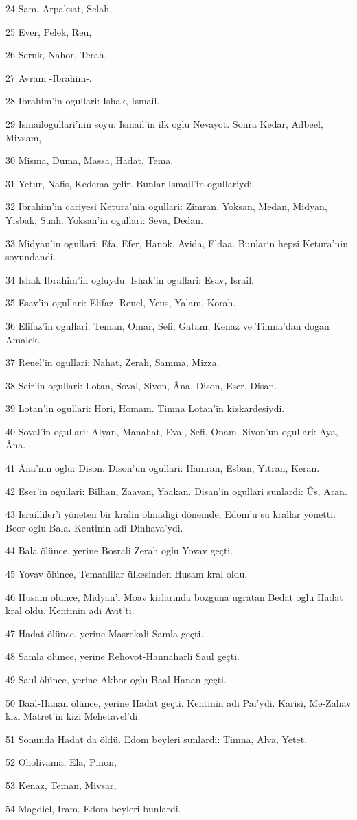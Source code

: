 \par 24 Sam, Arpaksat, Selah,
\par 25 Ever, Pelek, Reu,
\par 26 Seruk, Nahor, Terah,
\par 27 Avram -Ibrahim-.
\par 28 Ibrahim'in ogullari: Ishak, Ismail.
\par 29 Ismailogullari'nin soyu: Ismail'in ilk oglu Nevayot. Sonra Kedar, Adbeel, Mivsam,
\par 30 Misma, Duma, Massa, Hadat, Tema,
\par 31 Yetur, Nafis, Kedema gelir. Bunlar Ismail'in ogullariydi.
\par 32 Ibrahim'in cariyesi Ketura'nin ogullari: Zimran, Yoksan, Medan, Midyan, Yisbak, Suah. Yoksan'in ogullari: Seva, Dedan.
\par 33 Midyan'in ogullari: Efa, Efer, Hanok, Avida, Eldaa. Bunlarin hepsi Ketura'nin soyundandi.
\par 34 Ishak Ibrahim'in ogluydu. Ishak'in ogullari: Esav, Israil.
\par 35 Esav'in ogullari: Elifaz, Reuel, Yeus, Yalam, Korah.
\par 36 Elifaz'in ogullari: Teman, Omar, Sefi, Gatam, Kenaz ve Timna'dan dogan Amalek.
\par 37 Reuel'in ogullari: Nahat, Zerah, Samma, Mizza.
\par 38 Seir'in ogullari: Lotan, Soval, Sivon, Âna, Dison, Eser, Disan.
\par 39 Lotan'in ogullari: Hori, Homam. Timna Lotan'in kizkardesiydi.
\par 40 Soval'in ogullari: Alyan, Manahat, Eval, Sefi, Onam. Sivon'un ogullari: Aya, Âna.
\par 41 Âna'nin oglu: Dison. Dison'un ogullari: Hamran, Esban, Yitran, Keran.
\par 42 Eser'in ogullari: Bilhan, Zaavan, Yaakan. Disan'in ogullari sunlardi: Ûs, Aran.
\par 43 Israilliler'i yöneten bir kralin olmadigi dönemde, Edom'u su krallar yönetti: Beor oglu Bala. Kentinin adi Dinhava'ydi.
\par 44 Bala ölünce, yerine Bosrali Zerah oglu Yovav geçti.
\par 45 Yovav ölünce, Temanlilar ülkesinden Husam kral oldu.
\par 46 Husam ölünce, Midyan'i Moav kirlarinda bozguna ugratan Bedat oglu Hadat kral oldu. Kentinin adi Avit'ti.
\par 47 Hadat ölünce, yerine Masrekali Samla geçti.
\par 48 Samla ölünce, yerine Rehovot-Hannaharli Saul geçti.
\par 49 Saul ölünce, yerine Akbor oglu Baal-Hanan geçti.
\par 50 Baal-Hanan ölünce, yerine Hadat geçti. Kentinin adi Pai'ydi. Karisi, Me-Zahav kizi Matret'in kizi Mehetavel'di.
\par 51 Sonunda Hadat da öldü. Edom beyleri sunlardi: Timna, Alva, Yetet,
\par 52 Oholivama, Ela, Pinon,
\par 53 Kenaz, Teman, Mivsar,
\par 54 Magdiel, Iram. Edom beyleri bunlardi.

